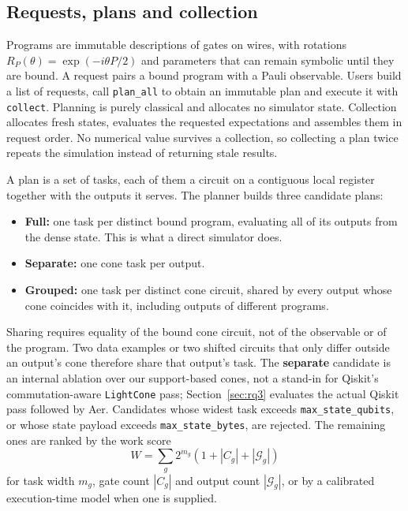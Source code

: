 \subsection{Requests, plans and collection}
Programs are immutable descriptions of gates on wires, with rotations $R_P(\theta)=\exp(-i\theta P/2)$ and parameters that can remain symbolic until they are bound. A request pairs a bound program with a Pauli observable. Users build a list of requests, call \texttt{plan\_all} to obtain an immutable plan and execute it with \texttt{collect}. Planning is purely classical and allocates no simulator state. Collection allocates fresh states, evaluates the requested expectations and assembles them in request order. No numerical value survives a collection, so collecting a plan twice repeats the simulation instead of returning stale results.

A plan is a set of tasks, each of them a circuit on a contiguous local register together with the outputs it serves. The planner builds three candidate plans:
\begin{itemize}
\item \textbf{Full:} one task per distinct bound program, evaluating all of its outputs from the dense state. This is what a direct simulator does.
\item \textbf{Separate:} one cone task per output.
\item \textbf{Grouped:} one task per distinct cone circuit, shared by every output whose cone coincides with it, including outputs of different programs.
\end{itemize}
Sharing requires equality of the bound cone circuit, not of the observable or of the program. Two data examples or two shifted circuits that only differ outside an output's cone therefore share that output's task. The \textbf{separate} candidate is an internal ablation over our support-based cones, not a stand-in for Qiskit's commutation-aware \texttt{LightCone} pass; Section~\ref{sec:rq3} evaluates the actual Qiskit pass followed by Aer. Candidates whose widest task exceeds \texttt{max\_state\_qubits}, or whose state payload exceeds \texttt{max\_state\_bytes}, are rejected. The remaining ones are ranked by the work score
\begin{equation}
W=\sum_g 2^{m_g}\left(1+|C_g|+|\mathcal{G}_g|\right)
\label{eq:work-score}
\end{equation}
for task width $m_g$, gate count $|C_g|$ and output count $|\mathcal{G}_g|$, or by a calibrated execution-time model when one is supplied.

